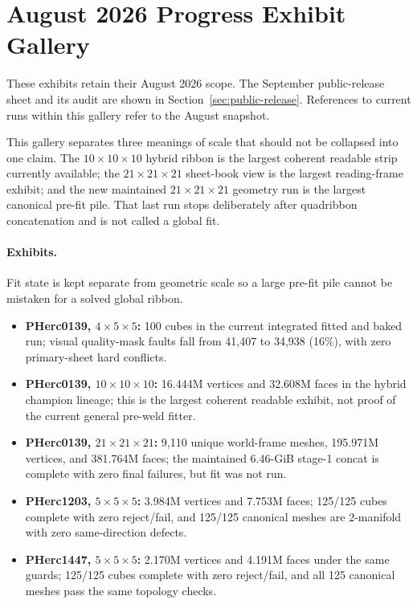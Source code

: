 \clearpage
\section{August 2026 Progress Exhibit Gallery}
\label{app:gallery}

These exhibits retain their August 2026 scope. The September public-release
sheet and its audit are shown in Section~\ref{sec:public-release}.
References to current runs within this gallery refer to the August snapshot.

This gallery separates three meanings of scale that should not be collapsed into
one claim. The $10\times10\times10$ hybrid ribbon is the largest coherent
readable strip currently available; the $21\times21\times21$ sheet-book view is
the largest reading-frame exhibit; and the new maintained
$21\times21\times21$ geometry run is the largest canonical pre-fit pile. That
last run stops deliberately after quadribbon concatenation and is not called a
global fit.

\paragraph{Exhibits.} Fit state is kept separate from geometric scale so
a large pre-fit pile cannot be mistaken for a solved global ribbon.
{\small
\begin{itemize}
  \setlength{\itemsep}{0.25em}
  \item \textbf{PHerc0139, $4\times5\times5$:} 100 cubes in the current
  integrated fitted and baked run; visual quality-mask faults fall from 41,407
  to 34,938 (16\%), with zero primary-sheet hard conflicts.
  \item \textbf{PHerc0139, $10\times10\times10$:} 16.444M vertices and
  32.608M faces in the hybrid champion lineage; this is the largest coherent
  readable exhibit, not proof of the current general pre-weld fitter.
  \item \textbf{PHerc0139, $21\times21\times21$:} 9,110 unique world-frame
  meshes, 195.971M vertices, and 381.764M faces; the maintained 6.46-GiB
  stage-1 concat is complete with zero final failures, but fit was not run.
  \item \textbf{PHerc1203, $5\times5\times5$:} 3.984M vertices and 7.753M
  faces; 125/125 cubes complete with zero reject/fail, and 125/125 canonical
  meshes are 2-manifold with zero same-direction defects.
  \item \textbf{PHerc1447, $5\times5\times5$:} 2.170M vertices and 4.191M
  faces under the same guards; 125/125 cubes complete with zero reject/fail,
  and all 125 canonical meshes pass the same topology checks.
\end{itemize}
}


